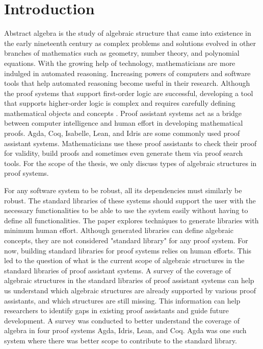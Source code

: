 \chapter{Introduction}
Abstract algebra is the study of algebraic structure that came into existence in
the early nineteenth century as complex problems and solutions evolved in other
branches of mathematics such as geometry, number theory, and polynomial
equations. With the growing help of technology, mathematicians are more indulged
in automated reasoning. Increasing powers of computers and software tools that
help automated reasoning become useful in their research. Although the
proof systems that support first-order logic are successful, developing a tool
that supports higher-order logic is complex and requires carefully defining
mathematical objects and concepts \cite{phillips2010automated}. Proof assistant
systems act as a bridge between computer intelligence and human effort in
developing mathematical proofs. Agda, Coq, Isabelle, Lean, and Idris are some
commonly used proof assistant systems. Mathematicians use these proof assistants
to check their proof for validity, build proofs and sometimes even generate them
via proof search tools. For the scope of the thesis, we only discuss types of
algebraic structures in proof systems.

For any software system to be robust, all its dependencies must similarly be
robust. The standard libraries of these systems should support the user with
the necessary functionalities to be able to use the system easily without having to
define all functionalities. The paper \cite{BuildingDiamond} explores techniques
to generate libraries with minimum human effort. Although generated libraries
can define algebraic concepts, they are not considered "standard library" for
any proof system. For now, building standard libraries for proof systems relies
on human efforts. This led to the question of what is the current scope of
algebraic structures in the standard libraries of proof assistant systems. A
survey of the coverage of algebraic structures in the standard libraries of
proof assistant systems can help us understand which algebraic structures are
already supported by various proof assistants, and which structures are still
missing. This information can help researchers to identify gaps in existing
proof assistants and guide future development. A survey was conducted to better
understand the coverage of algebra in four proof systems Agda, Idris, Lean, and
Coq. Agda was one such system where there was better scope to contribute to the
standard library.

